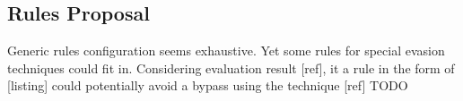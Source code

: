 \subsection{Rules Proposal}
Generic rules configuration seems exhaustive. Yet some rules for special evasion techniques could fit in. Considering evaluation result [ref], it a rule in the form of [listing] could potentially avoid a bypass using the technique [ref]{\color{red} TODO}

